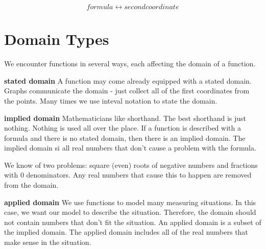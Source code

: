 \documentclass{ximera}
\begin{document}
\[
formula \leftrightarrow second coordinate
\]











































\section{Domain Types}

We encounter functions in several ways, each affecting the domain of a function.

\begin{enumeration}
\item \textbf{stated domain}
A function may come already equipped with a stated domain.  Graphs communicate the domain - just collect all of the first coordinates from the points. Many times we use inteval notation to state the domain.


\item \textbf{implied domain}
Mathematicians like shorthand. The best shorthand is just nothing.  Nothing is used all over the place. If a function is described with a formula and there is no stated domain, then there is an implied domain.  The implied domain si all real numbers that don't cause a problem with the formula.

We know of two problems: square (even) roots of negative numbers and fractions with $0$ denominators.  Any real numbers that cause this to happen are removed from the domain.


\item \textbf{applied domain}
We use functions to model many measuring situations. In this case, we want our model to describe the situation.  Therefore, the domain should not contain numbers that don't fit the situation. An applied domain is a subset of the implied domain.  The applied domain includes all of the real numbers that make sense in the situation.

\end{enumeration}
\end{document}
